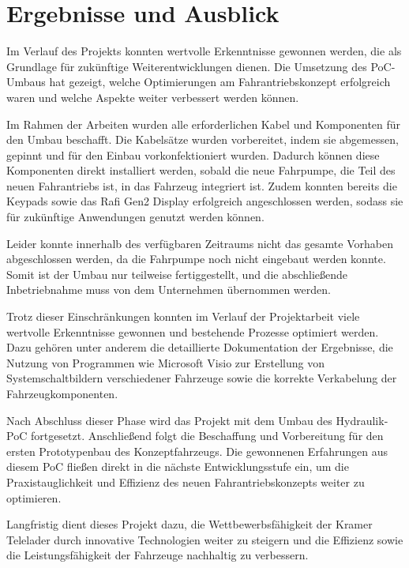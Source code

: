 \documentclass[a4paper, 12pt]{article} %
\begin{document}
\section{Ergebnisse und Ausblick}
\begin{spacing}{1.5}  %
    \fontsize{14pt}{14pt}\selectfont  %
    Im Verlauf des Projekts konnten wertvolle Erkenntnisse gewonnen werden, die als Grundlage für zukünftige Weiterentwicklungen dienen. 
    Die Umsetzung des \acf{PoC}-Umbaus hat gezeigt, welche Optimierungen am Fahrantriebskonzept erfolgreich waren und welche
    Aspekte weiter verbessert werden können.

    Im Rahmen der Arbeiten wurden alle erforderlichen Kabel und Komponenten für den Umbau beschafft. 
    Die Kabelsätze wurden vorbereitet, indem sie abgemessen, gepinnt und für den Einbau vorkonfektioniert wurden. Dadurch können diese 
    Komponenten direkt installiert werden, sobald die neue Fahrpumpe, die Teil des neuen Fahrantriebs ist, in das Fahrzeug integriert ist. Zudem konnten bereits die Keypads sowie 
    das Rafi Gen2 Display erfolgreich angeschlossen werden, sodass sie für zukünftige Anwendungen genutzt werden können.

    Leider konnte innerhalb des verfügbaren Zeitraums nicht das gesamte Vorhaben abgeschlossen werden, da die Fahrpumpe 
    noch nicht eingebaut werden konnte. Somit ist der Umbau nur teilweise fertiggestellt, und die abschließende Inbetriebnahme muss von 
    dem Unternehmen übernommen werden.  

    Trotz dieser Einschränkungen konnten im Verlauf der Projektarbeit viele wertvolle Erkenntnisse gewonnen und 
    bestehende Prozesse optimiert werden. Dazu gehören unter anderem die detaillierte Dokumentation der Ergebnisse, 
    die Nutzung von Programmen wie Microsoft Visio zur Erstellung von Systemschaltbildern verschiedener Fahrzeuge sowie die 
    korrekte Verkabelung der Fahrzeugkomponenten.

    Nach Abschluss dieser Phase wird das Projekt mit dem Umbau des Hydraulik-\acs{PoC} fortgesetzt. Anschließend 
    folgt die Beschaffung und Vorbereitung für den ersten Prototypenbau des Konzeptfahrzeugs. Die gewonnenen 
    Erfahrungen aus diesem \acs{PoC} fließen direkt in die nächste Entwicklungsstufe ein, um die Praxistauglichkeit und Effizienz 
    des neuen Fahrantriebskonzepts weiter zu optimieren.

    Langfristig dient dieses Projekt dazu, die Wettbewerbsfähigkeit der Kramer Telelader durch innovative 
    Technologien weiter zu steigern und die Effizienz sowie die Leistungsfähigkeit der Fahrzeuge nachhaltig
    zu verbessern.
\end{spacing}


\clearpage

\begingroup
\renewcommand{\bibfont}{\fontsize{13pt}{12pt}\selectfont}  
\sloppy
\nocite{*}
\printbibliography{}
\end{document}
